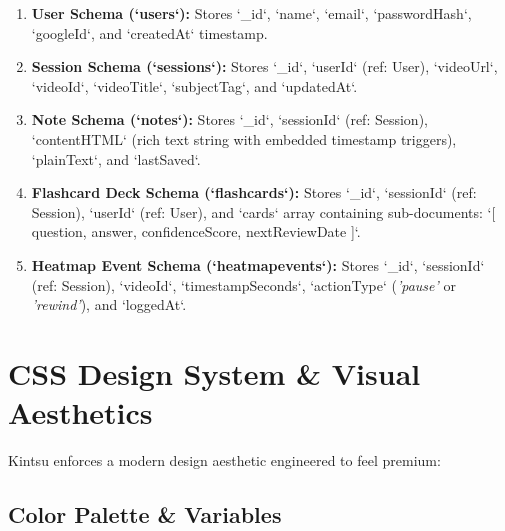 \documentclass[12pt,a4paper]{article}
\begin{document}
\begin{enumerate}[leftmargin=1.2cm]
    \item \textbf{User Schema (`users`):} Stores `_id`, `name`, `email`, `passwordHash`, `googleId`, and `createdAt` timestamp.
    \item \textbf{Session Schema (`sessions`):} Stores `_id`, `userId` (ref: User), `videoUrl`, `videoId`, `videoTitle`, `subjectTag`, and `updatedAt`.
    \item \textbf{Note Schema (`notes`):} Stores `_id`, `sessionId` (ref: Session), `contentHTML` (rich text string with embedded timestamp triggers), `plainText`, and `lastSaved`.
    \item \textbf{Flashcard Deck Schema (`flashcards`):} Stores `_id`, `sessionId` (ref: Session), `userId` (ref: User), and `cards` array containing sub-documents: `[{ question, answer, confidenceScore, nextReviewDate }]`.
    \item \textbf{Heatmap Event Schema (`heatmapevents`):} Stores `_id`, `sessionId` (ref: Session), `videoId`, `timestampSeconds`, `actionType` (\textit{'pause'} or \textit{'rewind'}), and `loggedAt`.
\end{enumerate}

\section{CSS Design System \& Visual Aesthetics}

Kintsu enforces a modern design aesthetic engineered to feel premium:

\subsection{Color Palette \& Variables}
\end{document}
